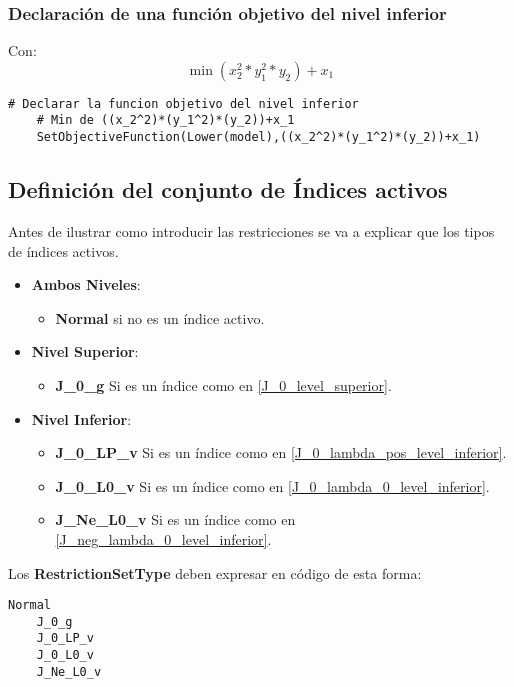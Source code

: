 \subsubsection{Declaración de una función objetivo del nivel inferior}

Con: $$\min (x_2^2*y_1^2*y_2)+x_1$$
\begin{lstlisting}[caption={Declarar una función objetivo del nivel inferior.}]
    # Declarar la funcion objetivo del nivel inferior
    # Min de ((x_2^2)*(y_1^2)*(y_2))+x_1
    SetObjectiveFunction(Lower(model),((x_2^2)*(y_1^2)*(y_2))+x_1)
\end{lstlisting}

\subsection{Definición del conjunto de Índices activos}

Antes de ilustrar como introducir las restricciones se va a explicar 
que los tipos de índices activos.

\begin{itemize}
    \item \textbf{Ambos Niveles}:
        \begin{itemize}
            \item \textbf{Normal} si no es un índice activo.
        \end{itemize}
    \item \textbf{Nivel Superior}:
     \begin{itemize}
        \item \textbf{J\_0\_g} Si es un índice como en \ref{J_0_level_superior}.
     \end{itemize}
    \item \textbf{Nivel Inferior}:
    \begin{itemize}
        \item \textbf{J\_0\_LP\_v} Si es un índice como en \ref{J_0_lambda_pos_level_inferior}.
        \item  \textbf{J\_0\_L0\_v} Si es un índice como en \ref{J_0_lambda_0_level_inferior}.
        \item  \textbf{J\_Ne\_L0\_v} Si es un índice como en \ref{J_neg_lambda_0_level_inferior}.
    \end{itemize}
\end{itemize}


Los \textbf{RestrictionSetType} deben expresar en código de esta forma:
\begin{lstlisting}[caption={Definir el conjunto de índice activo}]
    Normal 
    J_0_g 
    J_0_LP_v
    J_0_L0_v
    J_Ne_L0_v
\end{lstlisting}

